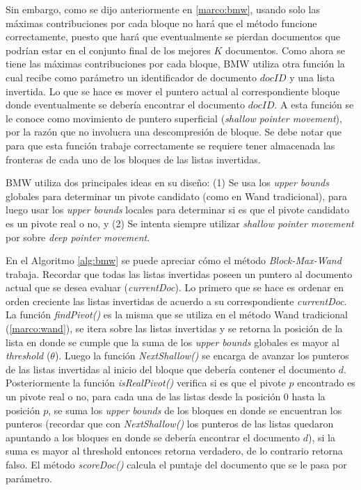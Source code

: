Sin embargo, como se dijo anteriormente en \ref{marco:bmw}, usando solo las máximas contribuciones por cada bloque no hará que el método funcione correctamente, puesto que hará que eventualmente se pierdan documentos que podrían estar en el conjunto final de los mejores $K$ documentos. Como ahora se tiene las máximas contribuciones por cada bloque, BMW utiliza otra función la cual recibe como parámetro un identificador de documento $docID$ y una lista invertida. Lo que se hace es mover el puntero actual al correspondiente bloque donde eventualmente se debería encontrar el documento $docID$. A esta función se le conoce como movimiento de puntero superficial (\textit{shallow pointer movement}), por la razón que no involucra una descompresión de bloque. Se debe notar que para que esta función trabaje correctamente se requiere tener almacenada las fronteras de cada uno de los bloques de las listas invertidas.

BMW utiliza dos principales ideas en su diseño: (1) Se usa los \textit{upper bounds} globales para determinar un pivote candidato (como en Wand tradicional), para luego usar los \textit{upper bounds} locales para determinar si es que el pivote candidato es un pivote real o no, y (2) Se intenta siempre utilizar \textit{shallow pointer movement} por sobre \textit{deep pointer movement}.

En el Algoritmo \ref{alg:bmw} se puede apreciar cómo el método \textit{Block-Max-Wand} trabaja. Recordar que todas las listas invertidas poseen un puntero al documento actual que se desea evaluar (\textit{currentDoc}). Lo primero que se hace es ordenar en orden creciente las listas invertidas de acuerdo a su correspondiente \textit{currentDoc}. La función \textit{findPivot()} es la misma que se utiliza en el método Wand tradicional (\ref{marco:wand}), se itera sobre las listas invertidas y se retorna la posición de la lista en donde se cumple que la suma de los \textit{upper bounds} globales es mayor al \textit{threshold} ($\theta$). Luego la función \textit{NextShallow()} se encarga de avanzar los punteros de las listas invertidas al inicio del bloque que debería contener el documento $d$. Posteriormente la función \textit{isRealPivot()} verifica si es que el pivote $p$ encontrado es un pivote real o no, para cada una de las listas desde la posición $0$ hasta la posición $p$, se suma los \textit{upper bounds} de los bloques en donde se encuentran los punteros (recordar que con \textit{NextShallow()} los punteros de las listas quedaron apuntando a los bloques en donde se debería encontrar el documento $d$), si la suma es mayor al threshold entonces retorna verdadero, de lo contrario retorna falso. El método \textit{scoreDoc()} calcula el puntaje del documento que se le pasa por parámetro. 

